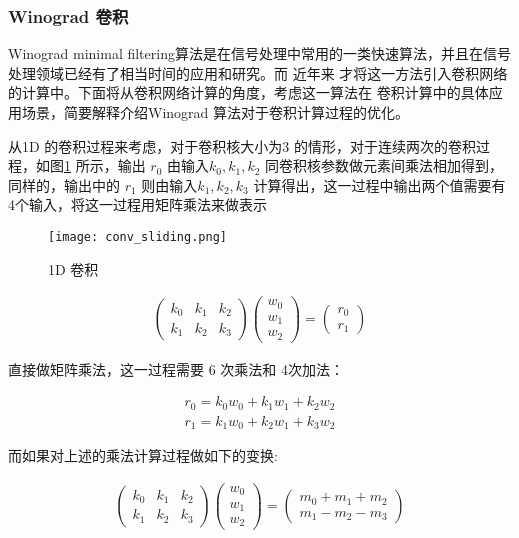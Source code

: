 \subsubsection{Winograd 卷积}

Winograd minimal filtering算法是在信号处理中常用的一类快速算法，并且在信号处理领域已经有了相当时间的应用和研究。而
近年来\cite{Lavin2015FastAF} 才将这一方法引入卷积网络的计算中。下面将从卷积网络计算的角度，考虑这一算法在
卷积计算中的具体应用场景，简要解释介绍Winograd 算法对于卷积计算过程的优化。

从1D 的卷积过程来考虑，对于卷积核大小为3 的情形，对于连续两次的卷积过程，如图\ref{fig:conv_slide}
所示，输出 $r_0$ 由输入$k_0, k_1, k_2$ 同卷积核参数做元素间乘法相加得到，同样的，输出中的 $r_1$ 
则由输入$k_1, k_2, k_3$ 计算得出，这一过程中输出两个值需要有4个输入，将这一过程用矩阵乘法来做表示

\begin{figure}
\centering
\texttt{[image: conv\_sliding.png]}
\caption{1D 卷积}
\label{fig:conv_slide}
\end{figure}


\begin{align}
  \begin{pmatrix}
    k_0 & k_1 & k_2 \\
    k_1 & k_2 & k_3 
  \end{pmatrix}
  \begin{pmatrix}
    w_0\\
    w_1\\
    w_2
  \end{pmatrix}
  =
  \begin{pmatrix}
    r_0 \\
    r_1
  \end{pmatrix}
\end{align}

直接做矩阵乘法，这一过程需要 6 次乘法和 4次加法：

\begin{align}
  r_0 = k_0 w_0 + k_1 w_1 + k_2 w_2 \\
  r_1 = k_1 w_0 + k_2 w_1 + k_3 w_2 
\end{align}

而如果对上述的乘法计算过程做如下的变换:

\begin{align}
\label{eq:winograd_mul}
  \begin{pmatrix}
    k_0 & k_1 & k_2 \\
    k_1 & k_2 & k_3 
  \end{pmatrix}
  \begin{pmatrix}
    w_0\\
    w_1\\
    w_2
  \end{pmatrix}
  =
  \begin{pmatrix}
    m_0 + m_1 + m_2 \\
    m_1 - m_2 - m_3
  \end{pmatrix}
\end{align}

